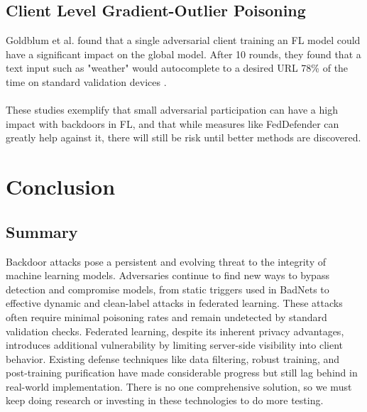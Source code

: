 \documentclass[sigconf,authorversion,nonacm,balance=false]{acmart}
\begin{document}
\subsection{Client Level Gradient-Outlier Poisoning}
Goldblum et al. found that a single adversarial client training an FL model could have a significant impact on the global model. After 10 rounds, they found that a text input such as "weather" would autocomplete to a desired URL 78\% of the time on standard validation devices \cite{background_attack_defense_goldblum_2023}.\\
\\
These studies exemplify that small adversarial participation can have a high impact with backdoors in FL, and that while measures like FedDefender can greatly help against it, there will still be risk until better methods are discovered.


\section{Conclusion}
\label{sec:conclusion}

\subsection{Summary}
Backdoor attacks pose a persistent and evolving threat to the integrity of machine learning models. Adversaries continue to find new ways to bypass detection and compromise models, from static triggers used in BadNets to effective dynamic and clean-label attacks in federated learning. These attacks often require minimal poisoning rates and remain undetected by standard validation checks. Federated learning, despite its inherent privacy advantages, introduces additional vulnerability by limiting server-side visibility into client behavior. Existing defense techniques like data filtering, robust training, and post-training purification have made considerable progress but still lag behind in real-world implementation. There is no one comprehensive solution, so we must keep doing research or investing in these technologies to do more testing.
\end{document}
